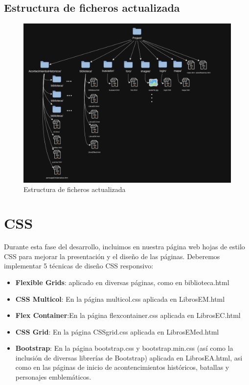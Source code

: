 \documentclass{article}
\begin{document}
\subsection{Estructura de ficheros actualizada}

\begin{figure}[H]
    \centering
    \includegraphics[width=\textwidth, height=0.8\textheight, keepaspectratio]{htmlFotos/estructuraFichero1.png}
    \caption{Estructura de ficheros actualizada}
    \label{fig:mapa_etiquetas_foro}
\end{figure}

\newpage

\section{CSS}

Durante esta fase del desarrollo, incluimos en nuestra página web hojas de estilo CSS para mejorar la presentación y el diseño de las páginas. Deberemos implementar 5 técnicas de diseño CSS responsivo:

\begin{itemize}
    \item \textbf{Flexible Grids}: aplicado en diversas páginas, como en biblioteca.html 
    \item \textbf{CSS Multicol}: En la página multicol.css aplicada en LibrosEM.html
    \item \textbf{Flex Container}:En la página flexcontainer.css aplicada en LibrosEC.html
    \item \textbf{CSS Grid}: En la página CSSgrid.css aplicada en LibrosEMed.html
    \item \textbf{Bootstrap}: En la página bootstrap.css y bootstrap.min.css (así como la inclusión de diversas librerías de Bootstrap) aplicada en LibrosEA.html, asi como en las páginas de inicio de acontencimientos históricos, batallas y personajes emblemáticos.
\end{itemize}
\end{document}
